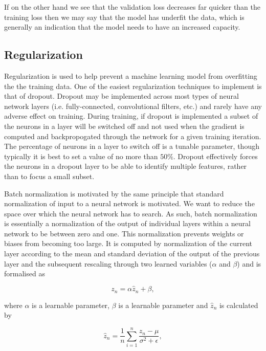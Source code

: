 If on the other hand we see that the validation loss decreases far quicker than the training loss then we may say that the model has underfit the data, which is generally an indication that the model needs to have an increased capacity.

%
%
\subsection{Regularization}

%
%
Regularization is used to help prevent a machine learning model from overfitting the the training data. One of the easiest regularization techniques to implement is that of dropout. Dropout may be implemented across most types of neural network layers (i.e. fully-connected, convolutional filters, etc.) and rarely have any adverse effect on training. During training, if dropout is implemented a subset of the neurons in a layer will be switched off and not used when the gradient is computed and backpropogated through the network for a given training iteration. The percentage of neurons in a layer to switch off is a tunable parameter, though typically it is best to set a value of no more than $50\%$. Dropout effectively forces the neurons in a dropout layer to be able to identify multiple features, rather than to focus a small subset.

%
%
Batch normalization is motivated by the same principle that standard normalization of input to a neural network is motivated. We want to reduce the space over which the neural network has to search. As such, batch normalization is essentially a normalization of the output of individual layers within a neural network to be between zero and one. This normalization prevents weights or biases from becoming too large. It is computed by normalization of the current layer according to the mean and standard deviation of the output of the previous layer and the subsequent rescaling through two learned variables ($\alpha$ and $\beta$) and is formalised as 

\begin{equation}
    z_n = \alpha \hat{z}_n + \beta,
\end{equation}{}

where $\alpha$ is a learnable parameter, $\beta$ is a learnable parameter and $\hat{z}_n$ is calculated by 

\begin{equation}\label{eq:batch_norm}
    \hat{z}_n = \frac{1}{n} \sum_{i=1}^{n} \frac{z_n - \mu}{\sigma^{2} + \epsilon},
\end{equation}{}

